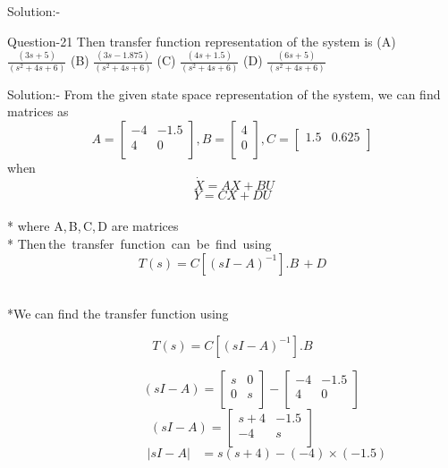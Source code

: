 \documentclass[journal,12pt,twocolumn]{IEEEtran}
\begin{document}
\begin{frame}{Solution:- }
\begin{frame}{}
\begin{frame}{Question-21 }
Then transfer function representation of the system is 
\vskip 0.8cm
\;\;\;\;(A) $\frac{(3s + 5)}{(s^2 + 4s + 6)}$ \; \;\; \;\;\;\;\;\;\;\;\;\;\;\;\;\;\;    (B) $\frac{(3s -1.875)}{(s^2 + 4s + 6)}$
\vskip 0.5cm
\;\;\;\;(C) $\frac{(4s + 1.5)}{(s^2 + 4s + 6)}$ \; \;\; \;\;\;\;\;\;\;\;\;\;\;\;\;\;\; (D) $\frac{(6s + 5)}{(s^2 + 4s + 6)}$
\vskip 0.4cm


\vskip 1cm

\end{frame}

\begin{frame}{Solution:- }
 From the given state space representation of the system, we can find matrices as
 \[
   A=
  \left[ {\begin{array}{cc}
   -4 & -1.5 \\
   4 & 0 \\
  \end{array} } \right] ,  
  B = \left[ {\begin{array}{cc}
  
      4   \\
      0 \\
  \end{array} }\right],                     C = \left[ {\begin{array}{cc}
   1.5 & 0.625 \\
  \end{array} }\right]\]
  when\[\;\dot{X} = AX + BU\]
  \[Y = CX + DU\]
  \\* where \; A,\,B,\,C,\,D \; are matrices 
  \\* Then\,the\, transfer\, function\, can\, be\, find\, using
  \[T(s) = C[(sI-A)^{-1}].B \,+ D\]
\end{frame}

\begin{frame}{}
\\*We can find the transfer function using

\[ T(s) = C[(sI - A)^{-1}].B \tag{$1$}\]

\[ \;\;\;\;\;\;\;\;\;\;\;(sI - A) = \left[ {\begin{array}{cc}
   s & 0 \\
   0 & s \\
  \end{array} } \right] - \left[ {\begin{array}{cc}
   -4 & -1.5 \\
   4 & 0 \\
  \end{array} } \right]\]
\[(sI - A) = \left[ {\begin{array}{cc}
   s + 4 & -1.5 \\
   -4 & s  \\
  \end{array} } \right] \tag{$2$}\]
   \vskip 0.01cm
\[ 
 \;\;\;\;\;\;\;\;\;\;\;\;\;\;\;\;\;\;\;\;|sI - A| \;\;\;= s(s+4) - (-4)\times (-1.5) \]
 \vskip 0.01cm
 

\end{frame}
\end{frame}
\end{frame}
\end{document}
